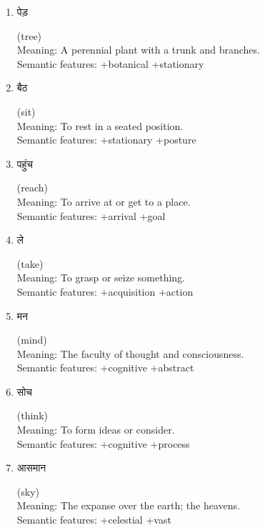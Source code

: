\documentclass{article}
\begin{document}
\begin{enumerate}
\item \begin{hindi} पेड़ \end{hindi} (tree) \\
Meaning: A perennial plant with a trunk and branches. \\
Semantic features: +botanical +stationary

\item \begin{hindi} बैठ \end{hindi} (sit) \\
Meaning: To rest in a seated position. \\
Semantic features: +stationary +posture

\item \begin{hindi} पहुंच \end{hindi} (reach) \\
Meaning: To arrive at or get to a place. \\
Semantic features: +arrival +goal

\item \begin{hindi} ले \end{hindi} (take) \\
Meaning: To grasp or seize something. \\
Semantic features: +acquisition +action

\item \begin{hindi} मन \end{hindi} (mind) \\
Meaning: The faculty of thought and consciousness. \\
Semantic features: +cognitive +abstract

\item \begin{hindi} सोच \end{hindi} (think) \\
Meaning: To form ideas or consider. \\
Semantic features: +cognitive +process

\item \begin{hindi} आसमान \end{hindi} (sky) \\
Meaning: The expanse over the earth; the heavens. \\
Semantic features: +celestial +vast


\end{enumerate}
\end{document}

